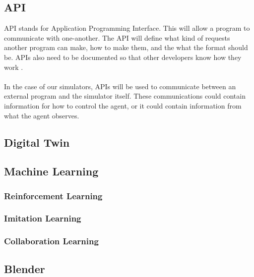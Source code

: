 \subsection{API}
API stands for Application Programming Interface. This will allow a program to communicate with one-another. The API will define what kind of requests another program can make, how to make them, and the what the format should be. APIs also need to be documented so that other developers know how they work \cite{WulfJochen2020FVCw}.
\\~\\
In the case of our simulators, APIs will be used to communicate between an external program and the simulator itself. These communications could contain information for how to control the agent, or it could contain information from what the agent observes. 

\subsection{Digital Twin}

\subsection{Machine Learning}
\subsubsection{Reinforcement Learning}

\subsubsection{Imitation Learning}

\subsubsection{Collaboration Learning}

\subsection{Blender}

